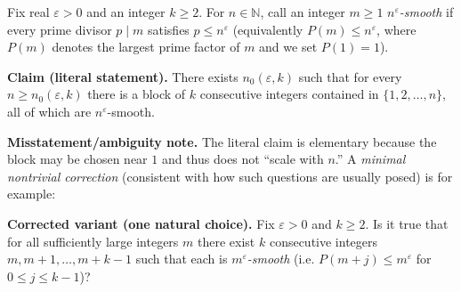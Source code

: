 Fix real $\varepsilon>0$ and an integer $k\ge 2$. For $n\in\mathbb{N}$, call an integer $m\ge 1$ \emph{$n^{\varepsilon}$-smooth} if every prime divisor $p\mid m$ satisfies $p\le n^{\varepsilon}$ (equivalently $P(m)\le n^{\varepsilon}$, where $P(m)$ denotes the largest prime factor of $m$ and we set $P(1)=1$).

\medskip
\noindent\textbf{Claim (literal statement).} There exists $n_0(\varepsilon,k)$ such that for every $n\ge n_0(\varepsilon,k)$ there is a block of $k$ consecutive integers contained in $\{1,2,\dots,n\}$, all of which are $n^{\varepsilon}$-smooth.

\medskip
\noindent\textbf{Misstatement/ambiguity note.} The literal claim is elementary because the block may be chosen near $1$ and thus does not ``scale with $n$.'' A \emph{minimal nontrivial correction} (consistent with how such questions are usually posed) is for example:

\smallskip
\noindent\textbf{Corrected variant (one natural choice).} Fix $\varepsilon>0$ and $k\ge 2$. Is it true that for all sufficiently large integers $m$ there exist $k$ consecutive integers $m,m+1,\dots,m+k-1$ such that each is \emph{$m^{\varepsilon}$-smooth} (i.e. $P(m+j)\le m^{\varepsilon}$ for $0\le j\le k-1$)?
